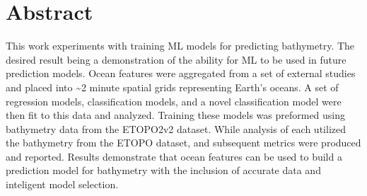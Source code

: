 \section{Abstract}
\setlength{\parindent}{10ex}
This work experiments with training \ac{ML} models for predicting bathymetry.
The desired result being a demonstration of the ability for \ac{ML} to be used in future prediction models.
Ocean features were aggregated from a set of external studies and placed into \~{}2 minute spatial grids representing Earth's oceans.
A set of regression models, classification models, and a novel classification model were then fit to this data and analyzed.
Training these models was preformed using bathymetry data from the ETOPO2v2 dataset.
While analysis of each utilized the bathymetry from the ETOPO dataset, and subsequent metrics were produced and reported.
Results demonstrate that ocean features can be used to build a prediction model for bathymetry with the inclusion of accurate data and inteligent model selection.
